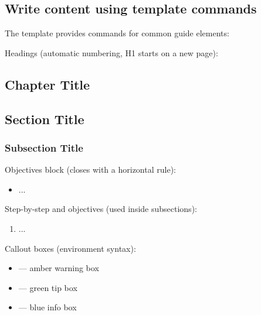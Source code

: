 \documentclass{guide}
\begin{document}
\subsection{Write content using template commands}

The template provides commands for common guide elements:

Headings (automatic numbering, H1 starts on a new page):

\begin{code}
\section{Chapter Title}          %
\subsection{Section Title}        %
\subsubsection{Subsection Title}  %
\end{code}

Objectives block (closes with a horizontal rule):

\begin{code}
\begin{objectives}
  \prerequisites
  \begin{itemize}
    \item ...
  \end{itemize}
\end{objectives}
\end{code}

Step-by-step and objectives (used inside subsections):

\begin{code}
\stepbystep
\begin{enumerate}
  \item ...
\end{enumerate}
\end{code}

Callout boxes (environment syntax):

\begin{itemize}
  \item {} --- amber warning box
  \item {} --- green tip box
  \item {} --- blue info box
\end{itemize}
\end{document}
